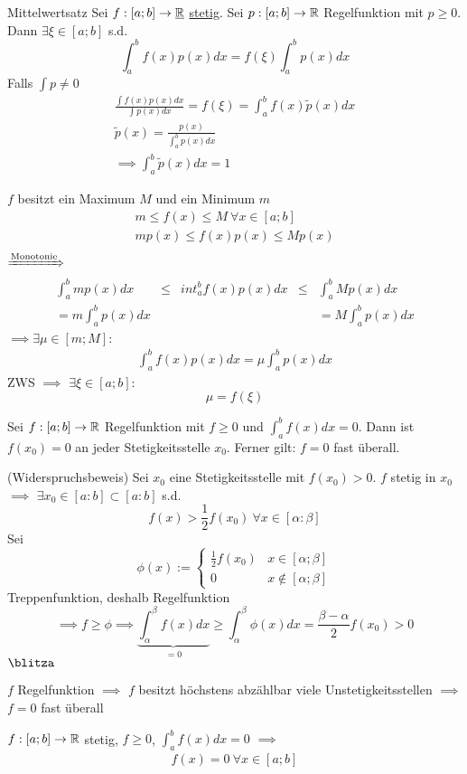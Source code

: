 \begin{Sat}{Mittelwertsatz}
  Sei $f:[a;b]\to \underline{\mathbb{R}}$ \underline{stetig}. Sei $p:[a;b]\to\mathbb{R}$ Regelfunktion mit $p\geq 0$. Dann $\exists \xi\in [a;b]$ s.d.
  \[\int^b_a f(x)p(x)dx=f(\xi)\int^b_a p(x)dx\]
  Falls $\int p \neq 0$
  \begin{align*}
    \frac{\int f(x)p(x)dx}{\int p(x)dx}=f(\xi)=\int^b_a f(x)\tilde{p}(x)dx\\
    \tilde{p}(x)=\frac{p(x)}{\int^b_ap(x)dx}\\
    \implies \int^b_a \tilde{p}(x) dx=1
  \end{align*}
\end{Sat}
\begin{Bew}
  $f$ besitzt ein Maximum $M$ und ein Minimum $m$
  \begin{align*}
    m\leq f(x) \leq M\ \forall x\in [a;b]\\
    m p(x)\leq f(x)p(x)\leq M p(x)\\
  \end{align*}
  $\xRightarrow{\text{Monotonie}}$
  \begin{align*}
    \int^b_am p(x)dx &\leq& int^b_a f(x)p(x)dx &\leq& \int^b_a M p(x)dx\\
    = m\int^b_ap(x)dx & & & &=M \int^b_a p(x)dx
  \end{align*}
  $\implies \exists \mu\in [m;M]$:
  \begin{align*}
    \int^b_af(x)p(x)dx = \mu \int^b_a p(x) dx    
  \end{align*}
  ZWS $\implies$ $\exists \xi \in [a;b]$:
  \[\mu=f(\xi)\]
\end{Bew}
\begin{Sat}
  Sei $f:[a;b]\to \mathbb{R}$ Regelfunktion mit $f\geq 0$ und $\int^b_af(x)dx=0$. Dann ist $f(x_0)=0$ an jeder Stetigkeitsstelle $x_0$. Ferner gilt: $f=0$ fast überall.
\end{Sat}
\begin{Bew}{(Widerspruchsbeweis)}
  Sei $x_0$ eine Stetigkeitsstelle mit $f(x_0)>0$. $f$ stetig in $x_0$ $\implies$ $\exists x_0 \in [a:b]\subset[a:b]$ s.d.
  \[f(x)>\frac{1}{2}f(x_0)\ \forall x\in [\alpha:\beta]\]
  Sei
  \[\phi(x):=\begin{cases}
    \frac{1}{2}f(x_0)&x\in [\alpha;\beta]\\
    0 & x\not\in [\alpha;\beta]
  \end{cases}\]
  Treppenfunktion, deshalb Regelfunktion
  \[\implies f\geq \phi \implies \underbrace{\int^\beta_\alpha f(x)dx}_{=0} \geq \int^\beta_\alpha\phi(x)dx=\frac{\beta-\alpha}{2}f(x_0)>0\]
  $\blitza$
\end{Bew}
\begin{Sat}
  $f$ Regelfunktion $\implies$ $f$ besitzt höchstens abzählbar viele Unstetigkeitsstellen $\implies$ $f=0$ fast überall
\end{Sat}
\begin{Kor}
  $f:[a;b]\to\mathbb{R}$ stetig, $f\geq 0$, $\int_a^bf(x)dx=0$ $\implies$
  \begin{align*}
    f(x)=0\ \forall x\in [a;b]    
  \end{align*}
\end{Kor}
